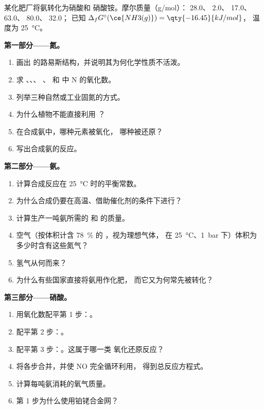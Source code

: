 \begin{problem}
\label{pb:b1:p-block-13-15:1}
某化肥厂将氨转化为硝酸和
硝酸铵。摩尔质量（\unit{g/mol}）： 28.0、 2.0、
17.0、 63.0、 80.0、 32.0；
已知 $\Delta_f G^\circ(\ce{NH3(g)}) = \qty{-16.45}{kJ/mol}$，
温度为 \qty{25}{\celsius}。

\medskip
\noindent\textbf{第一部分——氮。}
\begin{enumerate}
  \item 画出  的路易斯结构，并说明其为何化学性质不活泼。
  \item 求 、、、
        、 和  中 N 的氧化数。
  \item 列举三种自然或工业固氮的方式。
  \item 为什么植物不能直接利用 ？
  \item 在合成氨中，哪种元素被氧化，
        哪种被还原？
  \item 写出合成氨的反应。
\end{enumerate}

\medskip
\noindent\textbf{第二部分——氨。}
\begin{enumerate}[resume]
  \item 计算合成反应在
        \qty{25}{\celsius} 时的平衡常数。
  \item 为什么合成仍要在高温、借助催化剂的条件下进行？
  \item 计算生产一吨氨所需的  和 
        的质量。
  \item 空气（按体积计含 \qty{78}{\percent} 的 ，视为理想气体，
        在 \qty{25}{\celsius}、\qty{1}{bar} 下）体积为多少时含有这些氮气？
  \item 氢气从何而来？
  \item 为什么有些国家直接将氨用作化肥，
        而它又为何常先被转化？
\end{enumerate}

\medskip
\noindent\textbf{第三部分——硝酸。}
\begin{enumerate}[resume]
  \item 用氧化数配平第 1 步：。 %
  \item 配平第 2 步：。 %
  \item 配平第 3 步：。这属于哪一类 %
        氧化还原反应？
  \item 将各步合并，并使 NO 完全循环利用，
        得到总反应方程式。
  \item 计算每吨氨消耗的氧气质量。
  \item 第 1 步为什么使用铂铑合金网？
\end{enumerate}


\end{problem}
